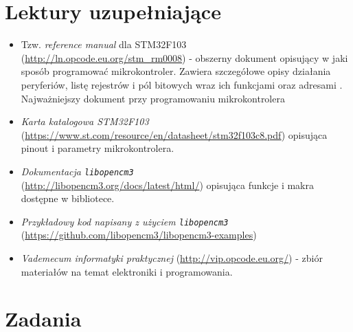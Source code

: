 \documentclass{pdfBooklets}
\begin{document}
\section{Lektury uzupełniające}
\begin{itemize}

\item Tzw. \emph{reference manual} dla STM32F103 (\url{http://ln.opcode.eu.org/stm_rm0008}) - obszerny dokument opisujący w jaki sposób programować
  mikrokontroler. Zawiera szczegółowe opisy działania peryferiów, listę rejestrów i pól bitowych wraz ich funkcjami oraz
  adresami \footnotemark. Najważniejszy dokument przy programowaniu mikrokontrolera
  

\item \emph{Karta katalogowa STM32F103}\\ (\url{https://www.st.com/resource/en/datasheet/stm32f103c8.pdf}) opisująca pinout i
  parametry mikrokontrolera.

\item \emph{Dokumentacja \Verb$libopencm3$}\\ (\url{http://libopencm3.org/docs/latest/html/}) opisująca funkcje i makra dostępne
  w bibliotece.
  
\item \emph{Przykładowy kod napisany z użyciem \Verb$libopencm3$} (\url{https://github.com/libopencm3/libopencm3-examples}) 
  
\item \emph{Vademecum informatyki praktycznej} (\url{http://vip.opcode.eu.org/}) - zbiór materiałów na temat elektroniki i programowania.

\end{itemize}

\section{Zadania}
\end{document}
